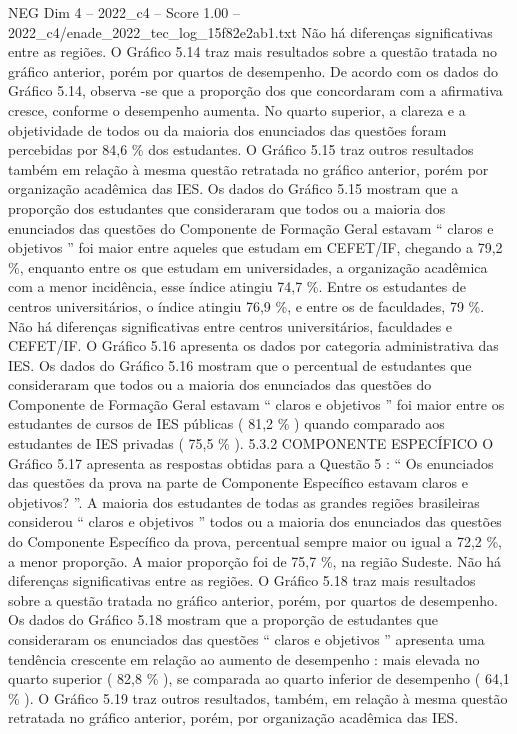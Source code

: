 \begin{textsample}{NEG Dim 4 – 2022\_c4 – Score 1.00 – 2022\_c4/enade\_2022\_tec\_log\_15f82e2ab1.txt}
Não há diferenças significativas entre as regiões.
O Gráfico 5.14 traz mais resultados sobre a questão tratada no gráfico anterior, porém por quartos de desempenho.
De acordo com os dados do Gráfico 5.14, observa -se que a proporção dos que concordaram com a afirmativa cresce, conforme o desempenho aumenta.
No quarto superior, a clareza e a objetividade de todos ou da maioria dos enunciados das questões foram percebidas por 84,6 \% dos estudantes.
O Gráfico 5.15 traz outros resultados também em relação à mesma questão retratada no gráfico anterior, porém por organização acadêmica das IES.
Os dados do Gráfico 5.15 mostram que a proporção dos estudantes que consideraram que todos ou a maioria dos enunciados das questões do Componente de Formação Geral estavam “ claros e objetivos ” foi maior entre aqueles que estudam em CEFET/IF, chegando a 79,2 \%, enquanto entre os que estudam em universidades, a organização acadêmica com a menor incidência, esse índice atingiu 74,7 \%.
Entre os estudantes de centros universitários, o índice atingiu 76,9 \%, e entre os de faculdades, 79 \%.
Não há diferenças significativas entre centros universitários, faculdades e CEFET/IF.
O Gráfico 5.16 apresenta os dados por categoria administrativa das IES.
Os dados do Gráfico 5.16 mostram que o percentual de estudantes que consideraram que todos ou a maioria dos enunciados das questões do Componente de Formação Geral estavam “ claros e objetivos ” foi maior entre os estudantes de cursos de IES públicas ( 81,2 \% ) quando comparado aos estudantes de IES privadas ( 75,5 \% ). 5.3.2 COMPONENTE ESPECÍFICO O Gráfico 5.17 apresenta as respostas obtidas para a Questão 5 : “ Os enunciados das questões da prova na parte de Componente Específico estavam claros e objetivos? ”.
A maioria dos estudantes de todas as grandes regiões brasileiras considerou “ claros e objetivos ” todos ou a maioria dos enunciados das questões do Componente Específico da prova, percentual sempre maior ou igual a 72,2 \%, a menor proporção.
A maior proporção foi de 75,7 \%, na região Sudeste.
Não há diferenças significativas entre as regiões.
O Gráfico 5.18 traz mais resultados sobre a questão tratada no gráfico anterior, porém, por quartos de desempenho.
Os dados do Gráfico 5.18 mostram que a proporção de estudantes que consideraram os enunciados das questões “ claros e objetivos ” apresenta uma tendência crescente em relação ao aumento de desempenho : mais elevada no quarto superior ( 82,8 \% ), se comparada ao quarto inferior de desempenho ( 64,1 \% ).
O Gráfico 5.19 traz outros resultados, também, em relação à mesma questão retratada no gráfico anterior, porém, por organização acadêmica das IES.

\end{textsample}
